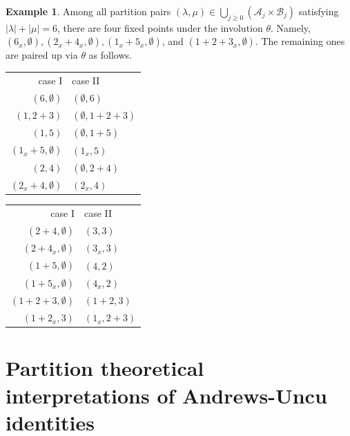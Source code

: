 \documentclass[11pt,reqno]{amsart}
\numberwithin{equation}{section}
\theoremstyle{plain}
\theoremstyle{definition}
\newtheorem{example}[theorem]{Example}
\def\A{\mathcal{A}}
\def\la{\lambda}
\newcommand{\B}{\mathcal{B}}
\begin{document}
\begin{example}
Among all partition pairs $(\la,\mu)\in\bigcup_{j\ge 0}(\A_j\times\B_j)$ satisfying $|\la|+|\mu|=6$, there are four fixed points under the involution $\theta$. Namely, $(6_{x}, \emptyset), (2_x+4_x, \emptyset), (1_x+5_x, \emptyset)$, and $(1+2+3_x, \emptyset)$. The remaining ones are paired up via $\theta$ as follows.
\\

\begin{minipage}[c]{0.5\textwidth}
\centering
\begin{tabular}{r|l}
case I & case II\\
$(6, \emptyset)$ & $(\emptyset, 6)$\\
$(1, 2+3)$ & $(\emptyset, 1+2+3)$ \\
$(1, 5)$ & $(\emptyset, 1+5)$\\
$(1_x+5, \emptyset)$ & $(1_x, 5)$\\
$(2, 4)$ & $(\emptyset, 2+4)$\\
$(2_x+4, \emptyset)$ & $(2_x, 4)$\\
\end{tabular}
\end{minipage}
\begin{minipage}[c]{0.5\textwidth}
\centering
\begin{tabular}{r|l}
case I & case II\\
$(2+4, \emptyset)$ & $(3, 3)$\\
$(2+4_x, \emptyset)$ & $(3_x, 3)$\\
$(1+5, \emptyset)$ & $(4, 2)$\\
$(1+5_x, \emptyset)$ & $(4_x, 2)$\\
$(1+2+3, \emptyset)$ & $(1+2, 3)$\\
$(1+2_x, 3)$ & $(1_x, 2+3)$\\
\end{tabular}
\end{minipage}
\end{example}




\section{Partition theoretical interpretations of Andrews-Uncu identities}\label{sec:Andrews-Uncu}
\end{document}
